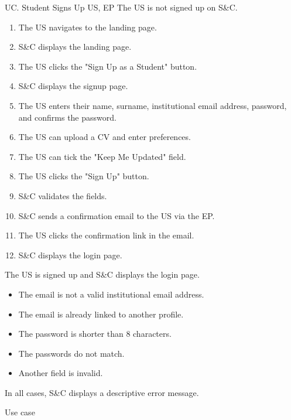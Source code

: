 \clearpage
\begin{usecase}
    {UC\theuc. Student Signs Up}
    {US, EP}
    {The US is not signed up on S\&C.}
    {\begin{enumerate}[leftmargin=*]
        \item The US navigates to the landing page.
        \item S\&C displays the landing page.
        \item The US clicks the "Sign Up as a Student" button.
        \item S\&C displays the signup page.
        \item The US enters their name, surname, institutional email address, password, and confirms the password.
        \item The US can upload a CV and enter preferences.
        \item The US can tick the "Keep Me Updated" field.
        \item The US clicks the "Sign Up" button.
        \item S\&C validates the fields.
        \item S\&C sends a confirmation email to the US via the EP.
        \item The US clicks the confirmation link in the email.
        \item S\&C displays the login page.
    \end{enumerate}}
    {The US is signed up and S\&C displays the login page.}
    {\begin{itemize}[leftmargin=*, label=\tiny\textbullet]
        \item The email is not a valid institutional email address.
        \item The email is already linked to another profile.
        \item The password is shorter than 8 characters.
        \item The passwords do not match.
        \item Another field is invalid.
    \end{itemize}
    In all cases, S\&C displays a descriptive error message.}
    {Use case \theuc}
\end{usecase}

